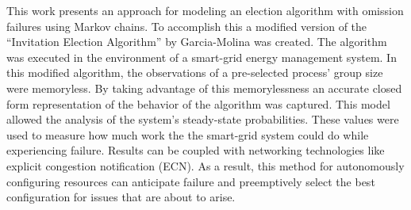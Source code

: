 This work presents an approach for modeling an election algorithm with omission failures using Markov chains.
To accomplish this a modified version of the ``Invitation Election Algorithm'' by Garcia-Molina was created.
The algorithm was executed in the environment of a smart-grid energy management system.
In this modified algorithm, the observations of a pre-selected process' group size were memoryless.
By taking advantage of this memorylessness an accurate closed form representation of the behavior of the algorithm was captured.
This model allowed the analysis of the system's steady-state probabilities.
These values were used to measure how much work the the smart-grid system could do while experiencing failure.
Results can be coupled with networking technologies like explicit congestion notification (ECN).
As a result, this method for autonomously configuring resources can anticipate failure and preemptively select the best configuration for issues that are about to arise.

